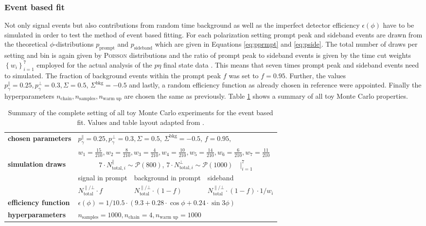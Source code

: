 \subsubsection{Event based fit}
Not only signal events but also contributions from random time background as well as the imperfect detector efficiency $\epsilon(\phi)$ have to be simulated in order to test the method of event based fitting. For each polarization setting prompt peak and sideband events are drawn from the theoretical $\phi$-distributions $p_\text{prompt}$ and $p_\text{sideband}$ which are given in Equations \eqref{eq:pprmpt} and \eqref{eq:pside}. The total number of draws per setting and bin is again given by \textsc{Poisson} distributions and the ratio of prompt peak to sideband events is given by the time cut weights $\left\{w_i\right\}_{i=1}^7$ employed for the actual analysis of the $p\eta$ final state data \cite{farahphd}. This means that seven times prompt peak and sideband events need to simulated. The fraction of background events within the prompt peak $f$ was set to $f=0.95$. Further, the values $p_\gamma^\parallel=0.25,p_\gamma^\bot=0.3,\Sigma=0.5$, $\Sigma^\text{bkg}=-0.5$ and lastly, a random efficiency function as already chosen in reference \cite{farahphd} were appointed. Finally the hyperparameters $n_\text{chain},n_\text{samples},n_\text{warm up}$ are chosen the same as previously. Table \ref{tab:mcsum} shows a summary of all toy Monte Carlo properties.
\begin{table}[htbp]

	\renewcommand{\arraystretch}{1.5}
	\centering
	\begin{tabularx}{\linewidth}{l|XXX}
		\toprule
		\textbf{chosen parameters} & \multicolumn{3}{l}{$p_\gamma^\parallel=0.25,p_\gamma^\bot=0.3,\Sigma=0.5$, $\Sigma^\text{bkg}=-0.5$, $f=0.95$,}\\ &\multicolumn{3}{l}{$w_1=\frac{15}{210},w_2=\frac{8}{210},w_3=\frac{4}{210},w_4=\frac{10}{210},w_5=\frac{14}{210},w_6=\frac{6}{210},w_7=\frac{11}{210}$}\\
		\hline
		\textbf{simulation draws} &\multicolumn{3}{c}{$7\cdot N^\parallel_{\text{total},i}\sim\mathcal{P}(800)$, $7\cdot N^\bot_{\text{total},i}\sim\mathcal{P}(1000)\quad\big|_{i=1}^7$}\\
		\cline{2-4}
		&signal in prompt&background in prompt& sideband \\
		&$N^{\parallel/\bot}_\text{total}\cdot f$&$N^{\parallel/\bot}_\text{total}\cdot\left(1-f\right)$&$N^{\parallel/\bot}_\text{total}\cdot\left(1-f\right)\cdot1/w_i$\\
		\hline
		\textbf{efficiency function}&\multicolumn{3}{l}{$\epsilon\left(\phi\right)=1/10.5\cdot\left(9.3+0.28\cdot\cos\phi+0.24\cdot\sin3\phi\right)$}\\
		\hline
		\textbf{hyperparameters}&\multicolumn{3}{l}{$n_\text{samples}=1000,n_\text{chain}=4,n_\text{warm up}=1000$}\\
		\bottomrule
	\end{tabularx}
	\caption{Summary of the complete setting of all toy Monte Carlo experiments for the event based fit. Values and table layout adapted from \cite{farahphd}.}
	\label{tab:mcsum}
\end{table}
